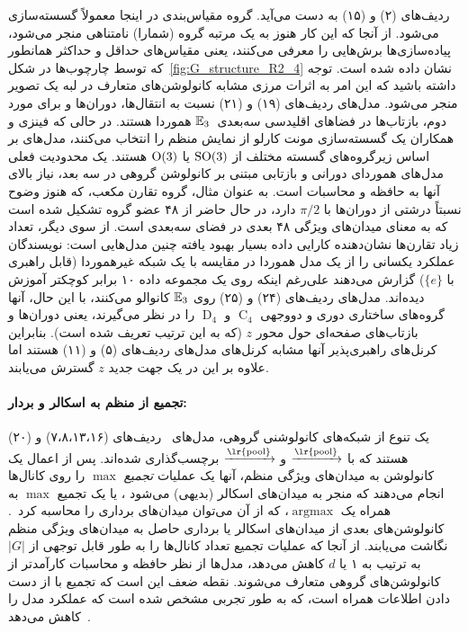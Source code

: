 ردیف‌های (۲) و (۱۵)
به دست می‌آید.
گروه مقیاس‌بندی در اینجا معمولاً گسسته‌سازی می‌شود.
از آنجا که این کار هنوز به یک مرتبه گروه (شمارا) نامتناهی منجر می‌شود، پیاده‌سازی‌ها برش‌هایی را معرفی می‌کنند، یعنی مقیاس‌های حداقل و حداکثر همانطور که توسط چارچوب‌ها در شکل~\ref{fig:G_structure_R2_4} نشان داده شده است.
توجه داشته باشید که این امر به اثرات مرزی مشابه کانولوشن‌های متعارف در لبه یک تصویر منجر می‌شود.
%
مدل‌های 
ردیف‌های (۱۹) و (۲۱)
نسبت به انتقال‌ها، دوران‌ها و برای مورد دوم، بازتاب‌ها در فضاهای اقلیدسی سه‌بعدی~$\mathbb{E}_3$ هموردا هستند.
در حالی که \cite{finzi2020generalizing} فینزی و همکاران یک گسسته‌سازی مونت کارلو از نمایش منظم را انتخاب می‌کنند،
مدل‌های \cite{Worrall2018-CUBENET,winkels3DGCNNsPulmonary2018} بر اساس زیرگروه‌های گسسته مختلف از $\operatorname{SO}(3)$ یا $\operatorname{O}(3)$ هستند.
یک محدودیت فعلی مدل‌های هموردای دورانی و بازتابی مبتنی بر کانولوشن گروهی در سه بعد، نیاز بالای آنها به حافظه و محاسبات است.
به عنوان مثال، گروه تقارن مکعب، که هنوز وضوح نسبتاً درشتی از دوران‌ها با $\pi/2$ دارد، در حال حاضر از ۴۸ عضو گروه تشکیل شده است که به معنای میدان‌های ویژگی ۴۸ بعدی در فضای سه‌بعدی است.
از سوی دیگر، تعداد زیاد تقارن‌ها نشان‌دهنده کارایی داده بسیار بهبود یافته چنین مدل‌هایی است:
نویسندگان \cite{winkels3DGCNNsPulmonary2018} عملکرد یکسانی را از یک مدل هموردا در مقایسه با یک شبکه غیرهموردا (قابل راهبری با $\{e\}$) گزارش می‌دهند علی‌رغم اینکه روی یک مجموعه داده ۱۰ برابر کوچکتر آموزش دیده‌اند.
%
مدل‌های 
ردیف‌های (۲۴) و (۲۵)
روی $\mathbb{E}_3$ کانوالو می‌کنند، با این حال، آنها گروه‌های ساختاری دوری و دووجهی $\operatorname{C}_4$ و $\operatorname{D}_4$ را در نظر می‌گیرند، یعنی دوران‌ها و بازتاب‌های صفحه‌ای حول محور $z$ (که به این ترتیب تعریف شده است).
بنابراین کرنل‌های راهبری‌پذیر آنها مشابه کرنل‌های مدل‌های 
ردیف‌های (۵) و (۱۱)
هستند اما علاوه بر این در یک جهت جدید $z$ گسترش می‌یابند.


\paragraph{تجمیع از منظم به اسکالر و بردار:}
یک تنوع از شبکه‌های کانولوشنی گروهی، مدل‌های 
ردیف‌های (۷،۸،۱۳،۱۶) و (۲۰)
هستند که با $\xrightarrow{\textup{\lr{pool}}}$ و $\xrightarrow{\textup{\lr{pool}}}$ برچسب‌گذاری شده‌اند.
پس از اعمال یک کانولوشن به میدان‌های ویژگی منظم، آنها یک عملیات \emph{تجمیع} $\operatorname{max}$ را روی کانال‌ها انجام می‌دهند که منجر به میدان‌های اسکالر (بدیهی) می‌شود \cite{Cohen2016-GCNN,marcos2016learning,Weiler2019_E2CNN,ghosh2019scale,andrearczyk2019exploring}، یا یک تجمیع $\operatorname{max}$ به همراه یک $\operatorname{argmax}$، که از آن می‌توان میدان‌های برداری را محاسبه کرد~\cite{Marcos2017-VFN,Weiler2019_E2CNN}.
کانولوشن‌های بعدی از میدان‌های اسکالر یا برداری حاصل به میدان‌های ویژگی منظم نگاشت می‌یابند.
از آنجا که عملیات تجمیع تعداد کانال‌ها را به طور قابل توجهی از $|G|$ به ترتیب به ۱ یا $d$ کاهش می‌دهد، مدل‌ها از نظر حافظه و محاسبات کارآمدتر از کانولوشن‌های گروهی متعارف می‌شوند.
نقطه ضعف این است که تجمیع با از دست دادن اطلاعات همراه است، که به طور تجربی مشخص شده است که عملکرد مدل را کاهش می‌دهد~\cite{Weiler2019_E2CNN}.



